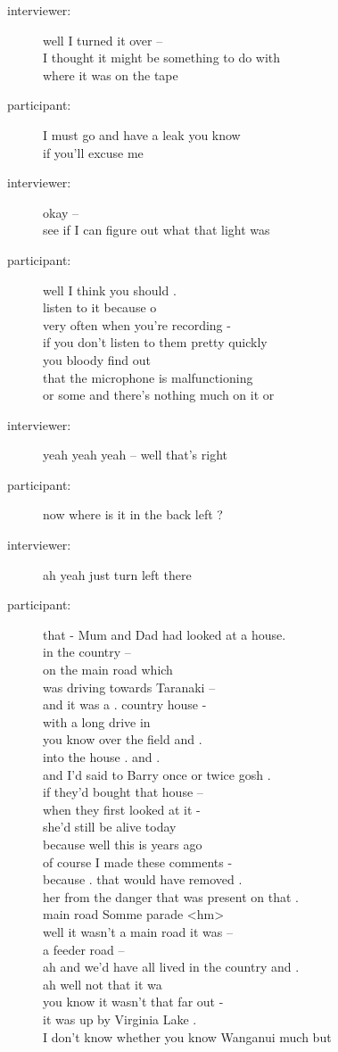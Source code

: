 \documentclass{article}
\newcommand{\turn}[2]{
\item[#1:] #2
}
\begin{document}
\begin{description}
\turn{interviewer}{well I turned it over --\\
I thought it might be something to do with\\
where it was on the tape}

\turn{participant}{I must go and have a leak you know\\
if you'll excuse me}

\turn{interviewer}{okay --\\
see if I can figure out what that light was}

\turn{participant}{well I think you should .\\
listen to it because o\\
very often when you're recording -\\
if you don't listen to them pretty quickly\\
you bloody find out\\
that the microphone is malfunctioning\\
or some and there's nothing much on it or }

\turn{interviewer}{yeah yeah yeah -- well that's right}

\turn{participant}{now where is it in the back left ?}

\turn{interviewer}{ah yeah just turn left there}

\turn{participant}{that - Mum and Dad had looked at a house.\\
in the country --\\
on the main road which\\
was driving towards Taranaki --\\
and it was a . country house -\\
with a long drive in\\
you know over the field and .\\
into the house . and .\\
and I'd said to Barry once or twice gosh .\\
if they'd bought that house --\\
when they first looked at it -\\
she'd still be alive today\\
because well this is years ago\\
of course I made these comments -\\
because . that would have removed .\\
her from the danger that was present on that .\\
main road Somme parade <hm>\\
well it wasn't a main road it was --\\
a feeder road --\\
ah and we'd have all lived in the country and .\\
ah well not that it wa~\\
you know it wasn't that far out -\\
it was up by Virginia Lake .\\
I don't know whether you know Wanganui much but}


\end{description}
\end{document}
